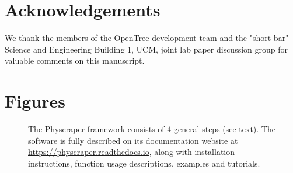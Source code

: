 \documentclass{bmcart}
\begin{document}
\begin{backmatter}
\section*{Acknowledgements}
We thank the members of the OpenTree development team and the "short bar" Science
and Engineering Building 1, UCM, joint lab paper discussion group for valuable
comments on this manuscript.







\section*{Figures}
  \begin{figure}[h!]
  \caption{The Physcraper framework consists of 4 general steps (see text). The software is fully
  described on its documentation website at \href{https://physcraper.readthedocs.io}{https://physcraper.readthedocs.io},
  along with installation instructions, function usage descriptions, examples and tutorials.
}
\end{figure}


\end{backmatter}
\end{document}
